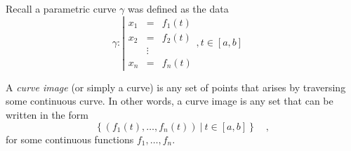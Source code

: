 
\begin{frame}
Recall a parametric curve $\gamma$  was defined as the data
\[
\gamma:
\left| 
\begin{array}{rcl}
x_1&=&f_1(t)\\
x_2&=&f_2(t)\\
&\vdots & \\
x_n&=&f_n(t)
\end{array} \right., t\in [a,b]\quad 
\]
\begin{definition}
A \emph{curve image} (or simply a curve) is any set of points that arises by traversing some \alert<2>{continuous} curve. In other words, a curve image is any set that can be written in the form
\[
\left\{(f_1(t),\dots, f_n(t))~|~ t\in [a,b]\right\}\quad ,
\]
for some \alert<2>{continuous} functions $f_1, \dots, f_n$.
\end{definition}

\end{frame}